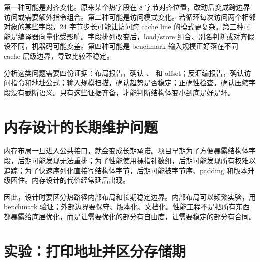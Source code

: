 第一种可能是对齐变化。原来某个热字段在 8 字节对齐位置，改动后变成跨边界访问或需要额外指令组合。第二种可能是访问模式变化。若循环每次访问两个相邻对象的某些字段，24 字节步长可能让访问跨 cache line 的模式更复杂。第三种可能是编译器向量化受影响。字段排列改变后，load/store 组合、别名判断或对齐假设不同，机器码可能变差。第四种可能是 benchmark 输入规模正好落在不同 cache 层级边界，导致比较不稳定。

分析这类问题需要四份证据：布局报告，确认 、 和 offset；反汇编报告，确认访问指令和地址公式；输入规模扫描，确认趋势是否稳定；正确性检查，确认压缩字段没有截断语义。只有这些证据齐备，才能判断结构体变小到底是好是坏。

\section{内存设计的长期维护问题}

内存布局一旦进入公共接口，就会变成长期承诺。项目早期为了方便暴露结构体字段，后期可能发现无法重排；为了性能使用裸指针数组，后期可能发现所有权难以追踪；为了快速序列化直接写结构体字节，后期可能被字节序、padding 和版本升级困住。内存设计的代价经常延后出现。

因此，设计时要区分热路径内部布局和长期稳定边界。内部布局可以频繁实验，用 benchmark 验证；外部边界要保守、版本化、文档化。性能工程不是把所有东西都暴露给底层优化，而是让需要优化的部分有自由度，让需要稳定的部分有合同。

\section{实验：打印地址并区分存储期}


